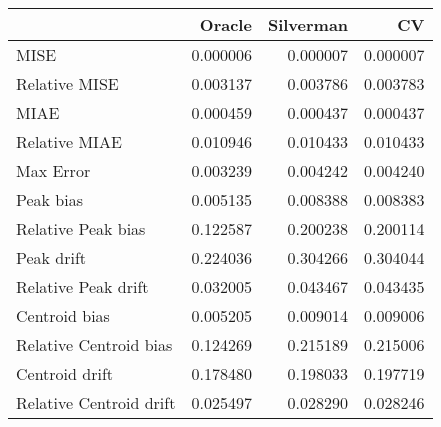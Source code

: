 \begin{tabular}{lrrr}
  \hline
 & Oracle & Silverman & CV \\ 
  \hline
MISE & 0.000006 & 0.000007 & 0.000007 \\ 
  Relative MISE & 0.003137 & 0.003786 & 0.003783 \\ 
  MIAE & 0.000459 & 0.000437 & 0.000437 \\ 
  Relative MIAE & 0.010946 & 0.010433 & 0.010433 \\ 
  Max Error & 0.003239 & 0.004242 & 0.004240 \\ 
  Peak bias & 0.005135 & 0.008388 & 0.008383 \\ 
  Relative Peak bias & 0.122587 & 0.200238 & 0.200114 \\ 
  Peak drift & 0.224036 & 0.304266 & 0.304044 \\ 
  Relative Peak drift & 0.032005 & 0.043467 & 0.043435 \\ 
  Centroid bias & 0.005205 & 0.009014 & 0.009006 \\ 
  Relative Centroid bias & 0.124269 & 0.215189 & 0.215006 \\ 
  Centroid drift & 0.178480 & 0.198033 & 0.197719 \\ 
  Relative Centroid drift & 0.025497 & 0.028290 & 0.028246 \\ 
   \hline
\end{tabular}
